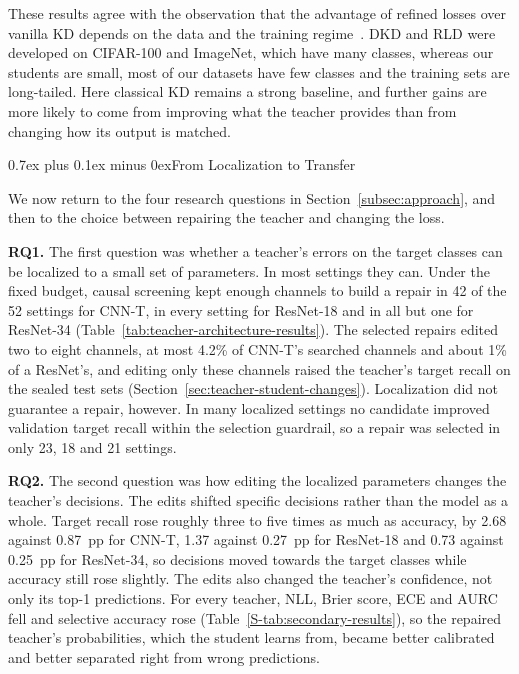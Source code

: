 \documentclass[10pt,journal,compsoc]{IEEEtran}
\makeatletter
\def\subsection{\@startsection{subsection}{2}{\z@}{-3.5ex plus -0.5ex minus -1.5ex}%
{0.7ex plus 0.1ex minus 0ex}{\normalfont\normalsize\sffamily\bfseries}}
\theoremstyle{definition}
\makeatother
\begin{document}
These results agree with the observation that the advantage of refined
losses over vanilla KD depends on the data and the training
regime~\cite{hao2023revisit}. DKD and RLD were developed on CIFAR-100
and ImageNet, which have many classes, whereas our students are small,
most of our datasets have few classes and the training sets are
long-tailed. Here classical KD remains a strong
baseline, and further gains are more likely to come from improving what
the teacher provides than from changing how its output is matched.

\vspace{-5pt}
\subsection{From Localization to Transfer}
\label{sec:discussion-rqs}

We now return to the four research questions in
Section~\ref{subsec:approach}, and then to the choice between repairing
the teacher and changing the loss.

\textbf{RQ1.} The first question was whether a teacher's errors on the
target classes can be localized to a small set of parameters. In most
settings they can. Under the fixed budget, causal screening kept enough
channels to build a repair in 42 of the 52 settings for CNN-T, in every
setting for ResNet-18 and in all but one for ResNet-34
(Table~\ref{tab:teacher-architecture-results}). The selected repairs
edited two to eight channels, at most 4.2\% of CNN-T's searched
channels and about 1\% of a ResNet's, and editing only these channels
raised the teacher's target recall on the sealed test sets
(Section~\ref{sec:teacher-student-changes}). Localization did not
guarantee a repair, however. In many localized settings no candidate
improved validation target recall within the selection guardrail, so a
repair was selected in only 23, 18 and 21 settings.

\textbf{RQ2.} The second question was how editing the localized
parameters changes the teacher's decisions. The edits shifted specific
decisions rather than the model as a whole. Target recall rose roughly
three to five times as much as accuracy, by 2.68 against 0.87~pp for
CNN-T, 1.37 against 0.27~pp for ResNet-18 and 0.73 against 0.25~pp for
ResNet-34, so decisions moved towards the target classes while
accuracy still rose slightly. The edits also changed
the teacher's confidence, not only its top-1 predictions. For every
teacher, NLL, Brier score, ECE and AURC fell and selective accuracy rose
(Table~\ref{S-tab:secondary-results}), so the repaired teacher's
probabilities, which the student learns from,
became better calibrated and better separated right from wrong
predictions.
\end{document}
